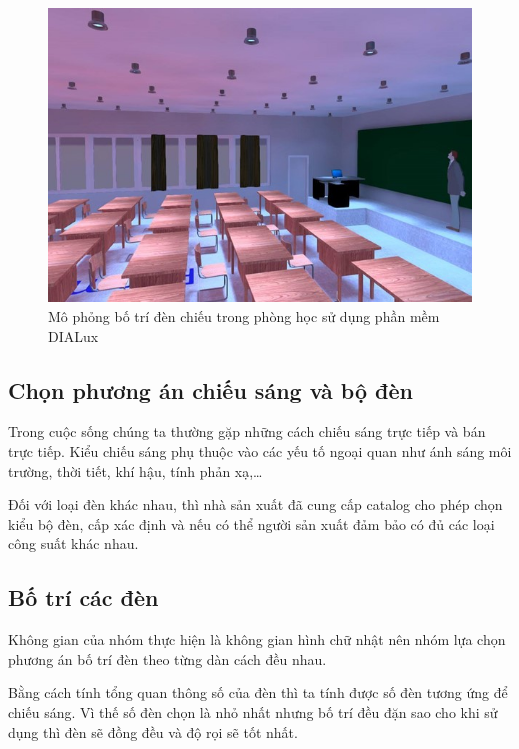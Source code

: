 \begin{center}
    \begin{figure}[ht]
    \begin{center}
     \includegraphics[scale=1]{Chapters/Chapter3/Images/Phonghocmophong}
    \end{center}
    \caption{Mô phỏng bố trí đèn chiếu trong phòng học sử dụng phần mềm DIALux}
    \label{fig:phonghocmophong}
    \end{figure}
\end{center}

\subsection{Chọn phương án chiếu sáng và bộ đèn}
Trong cuộc sống chúng ta thường gặp những cách chiếu sáng trực tiếp và bán trực tiếp. Kiểu chiếu sáng phụ thuộc vào các yếu tố ngoại quan như ánh sáng môi trường, thời tiết, khí hậu, tính phản xạ,…

Đối với loại đèn khác nhau, thì nhà sản xuất đã cung cấp catalog cho phép chọn kiểu bộ đèn, cấp xác định và nếu có thể người sản xuất đảm bảo có đủ các loại công suất khác nhau.

\subsection{Bố trí các đèn}
Không gian của nhóm thực hiện là không gian hình chữ nhật nên nhóm lựa chọn phương án bố trí đèn theo từng dàn cách đều nhau.

Bằng cách tính tổng quan thông số của đèn thì ta tính được số đèn tương ứng để chiếu sáng. Vì thế số đèn chọn là nhỏ nhất nhưng bố trí đều đặn sao cho khi sử dụng thì đèn sẽ đồng đều và độ rọi sẽ tốt nhất.

